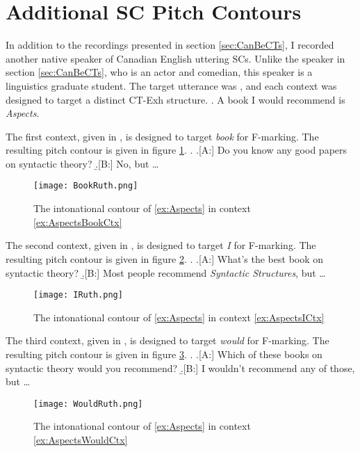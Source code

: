 \documentclass[
	letterpaper,
]{article}
\begin{document}
\appendix
\section{Additional SC Pitch Contours}\label{sec:append}
In addition to the recordings presented in section \ref{sec:CanBeCTs}, I recorded another native speaker of Canadian English uttering SCs.
Unlike the speaker in section \ref{sec:CanBeCTs}, who is an actor and comedian, this speaker is a linguistics graduate student.
The target utterance was \Next, and each context was designed to target a distinct CT-Exh structure.
\ex.\label{ex:Aspects} A book I would recommend is \textit{Aspects}.

The first context, given in \Next, is designed to target \textit{book} for F-marking.
The resulting pitch contour is given in figure \ref{fig:BookRuth}.
\ex. \label{ex:AspectsBookCtx}
\a.[A:] Do you know any good papers on syntactic theory?
\b.[B:] No, but \dots

\begin{figure}[h]
	\centering
	\texttt{[image: BookRuth.png]}
	\caption{The intonational contour of \ref{ex:Aspects} in context \ref{ex:AspectsBookCtx}}
	\label{fig:BookRuth}
\end{figure}
\FloatBarrier

The second context, given in \Next, is designed to target \textit{I} for F-marking.
The resulting pitch contour is given in figure \ref{fig:IRuth}.
\ex.\label{ex:AspectsICtx}
\a.[A:] What’s the best book on syntactic theory?
\b.[B:] Most people recommend \textit{Syntactic Structures}, but \dots

\begin{figure}[h]
	\centering
	\texttt{[image: IRuth.png]}
	\caption{The intonational contour of \ref{ex:Aspects} in context \ref{ex:AspectsICtx}}
	\label{fig:IRuth}
\end{figure}
\FloatBarrier

The third context, given in \Next, is designed to target \textit{would} for F-marking.
The resulting pitch contour is given in figure \ref{fig:WouldRuth}.
\ex.\label{ex:AspectsWouldCtx}
\a.[A:] Which of these books on syntactic theory would you recommend?
\b.[B:] I wouldn’t recommend any of those, but \dots

\begin{figure}[h]
	\centering
	\texttt{[image: WouldRuth.png]}
	\caption{The intonational contour of \ref{ex:Aspects} in context \ref{ex:AspectsWouldCtx}}
	\label{fig:WouldRuth}
\end{figure}
\FloatBarrier

\nocite{mikkelsen2004specifying}
\printbibliography
\end{document}
